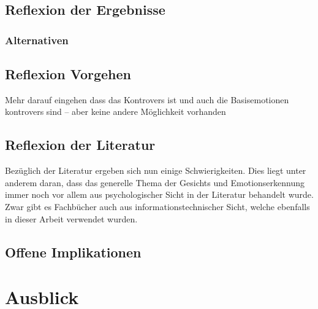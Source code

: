 \documentclass[12pt, a4paper]{report}
\begin{document}
\section{Reflexion der Ergebnisse}

\subsection{Alternativen}

\section{Reflexion Vorgehen}
Mehr darauf eingehen dass das Kontrovers ist und auch die Basisemotionen kontrovers sind --  aber keine andere Möglichkeit vorhanden 

\section{Reflexion der Literatur}
Bezüglich der Literatur ergeben sich nun einige Schwierigkeiten. Dies liegt unter anderem daran, dass das generelle Thema der Gesichts und Emotionserkennung immer noch vor allem aus
psychologischer Sicht in der Literatur behandelt wurde. Zwar gibt es Fachbücher auch aus informationstechnischer Sicht, welche ebenfalls in dieser Arbeit verwendet wurden.

\section{Offene Implikationen}

\chapter{Ausblick}
\end{document}
